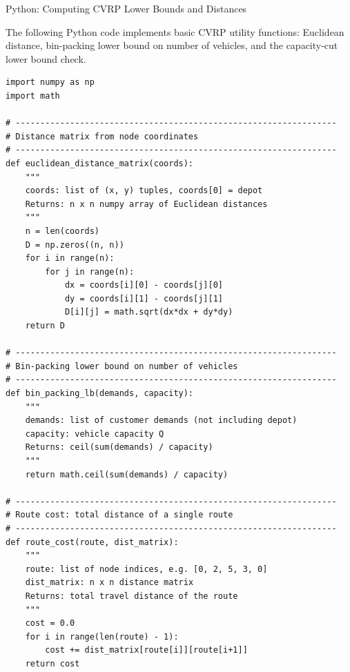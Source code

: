 \documentclass[aspectratio=169,10pt]{beamer}
\begin{document}
\begin{frame}[fragile]{Python: Computing CVRP Lower Bounds and Distances}

The following Python code implements basic CVRP utility functions: Euclidean distance,
bin-packing lower bound on number of vehicles, and the capacity-cut lower bound check.

\begin{lstlisting}[caption={CVRP utility functions (Python 3)}]
import numpy as np
import math

# -----------------------------------------------------------------
# Distance matrix from node coordinates
# -----------------------------------------------------------------
def euclidean_distance_matrix(coords):
    """
    coords: list of (x, y) tuples, coords[0] = depot
    Returns: n x n numpy array of Euclidean distances
    """
    n = len(coords)
    D = np.zeros((n, n))
    for i in range(n):
        for j in range(n):
            dx = coords[i][0] - coords[j][0]
            dy = coords[i][1] - coords[j][1]
            D[i][j] = math.sqrt(dx*dx + dy*dy)
    return D

# -----------------------------------------------------------------
# Bin-packing lower bound on number of vehicles
# -----------------------------------------------------------------
def bin_packing_lb(demands, capacity):
    """
    demands: list of customer demands (not including depot)
    capacity: vehicle capacity Q
    Returns: ceil(sum(demands) / capacity)
    """
    return math.ceil(sum(demands) / capacity)

# -----------------------------------------------------------------
# Route cost: total distance of a single route
# -----------------------------------------------------------------
def route_cost(route, dist_matrix):
    """
    route: list of node indices, e.g. [0, 2, 5, 3, 0]
    dist_matrix: n x n distance matrix
    Returns: total travel distance of the route
    """
    cost = 0.0
    for i in range(len(route) - 1):
        cost += dist_matrix[route[i]][route[i+1]]
    return cost
\end{lstlisting}

\end{frame}
\end{document}
